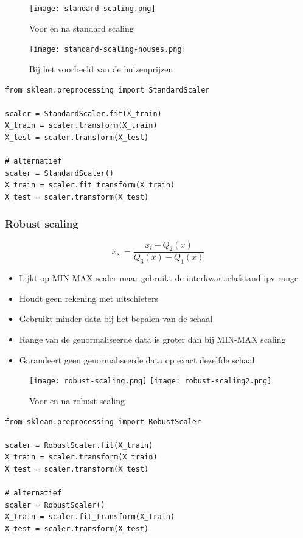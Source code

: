\documentclass{article}
\begin{document}
\begin{figure}[H]
    \centering
    \texttt{[image: standard-scaling.png]}
    \caption{Voor en na standard scaling}
\end{figure}

\begin{figure}[H]
    \centering
    \texttt{[image: standard-scaling-houses.png]}
    \caption{Bij het voorbeeld van de huizenprijzen}
\end{figure}


\begin{verbatim}
from sklean.preprocessing import StandardScaler

scaler = StandardScaler.fit(X_train)
X_train = scaler.transform(X_train)
X_test = scaler.transform(X_test)

# alternatief
scaler = StandardScaler()
X_train = scaler.fit_transform(X_train)
X_test = scaler.transform(X_test)
\end{verbatim}

\subsubsection{Robust scaling}

\begin{equation}
x_{s_i} = \frac{x_i - Q_2(x)}{Q_3(x) - Q_1(x)}
\end{equation}

\begin{itemize}
    \item Lijkt op MIN-MAX scaler maar gebruikt de interkwartielafstand ipv range
    \item Houdt geen rekening met uitschieters
    \item Gebruikt minder data bij het bepalen van de schaal
    \item Range van de genormaliseerde data is groter dan bij MIN-MAX scaling
    \item Garandeert geen genormaliseerde data op exact dezelfde schaal
\end{itemize}

\begin{figure}[H]
    \centering
    \texttt{[image: robust-scaling.png]}
    \texttt{[image: robust-scaling2.png]}
    \caption{Voor en na robust scaling}
\end{figure}

\begin{verbatim}
from sklean.preprocessing import RobustScaler

scaler = RobustScaler.fit(X_train)
X_train = scaler.transform(X_train)
X_test = scaler.transform(X_test)

# alternatief
scaler = RobustScaler()
X_train = scaler.fit_transform(X_train)
X_test = scaler.transform(X_test)
\end{verbatim}
\end{document}
